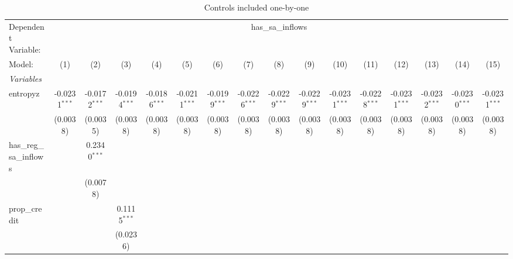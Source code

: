 
\begin{table}[htbp]
   \centering
   \caption{\label{tab:reg_sw0} Controls included one-by-one}
   \begin{tiny}
      \begin{tabular}{lccccccccccccccc}
         \tabularnewline\midrule\midrule
         Dependent Variable: & \multicolumn{15}{c}{has\_sa\_inflows}\\
         Model:                   & (1)             & (2)             & (3)             & (4)             & (5)             & (6)             & (7)             & (8)             & (9)             & (10)            & (11)            & (12)            & (13)            & (14)            & (15)\\
         \midrule \emph{Variables} &   &   &   &   &   &   &   &   &   &   &   &   &   &   &  \\
         entropyz                 & -0.0231$^{***}$ & -0.0172$^{***}$ & -0.0194$^{***}$ & -0.0186$^{***}$ & -0.0211$^{***}$ & -0.0199$^{***}$ & -0.0226$^{***}$ & -0.0229$^{***}$ & -0.0229$^{***}$ & -0.0231$^{***}$ & -0.0228$^{***}$ & -0.0231$^{***}$ & -0.0232$^{***}$ & -0.0230$^{***}$ & -0.0231$^{***}$\\
                                  & (0.0038)        & (0.0035)        & (0.0038)        & (0.0038)        & (0.0038)        & (0.0038)        & (0.0038)        & (0.0038)        & (0.0038)        & (0.0038)        & (0.0038)        & (0.0038)        & (0.0038)        & (0.0038)        & (0.0038)\\
         has\_reg\_sa\_inflows &                 & 0.2340$^{***}$  &                 &                 &                 &                 &                 &                 &                 &                 &                 &                 &                 &                 &   \\
                                  &                 & (0.0078)        &                 &                 &                 &                 &                 &                 &                 &                 &                 &                 &                 &                 &   \\
         prop\_credit            &                 &                 & 0.1115$^{***}$  &                 &                 &                 &                 &                 &                 &                 &                 &                 &                 &                 &   \\
                                  &                 &                 & (0.0236)        &                 &                 &                 &                 &                 &                 &                 &                 &                 &                 &                 &   \\

\end{tabular}
\end{tiny}
\end{table}

